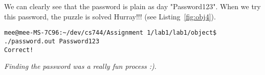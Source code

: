 \documentclass[final,5p,times,authoryear]{elsarticle}
\begin{document}
We can clearly see that the password is plain as day "Password123".
When we try this password, the puzzle is solved Hurray!!! (see Listing~\ref{fig:obj4}).

\begin{lstlisting}[captionpos=b, caption={Snippet showing the block containing the phrase "Incorrect".},label={fig:obj4},style=codeBash]
mee@mee-MS-7C96:~/dev/cs744/Assignment 1/lab1/lab1/object$ ./password.out Password123
Correct!
\end{lstlisting}

{\it Finding the password was a really fun process :)}.
\end{document}
